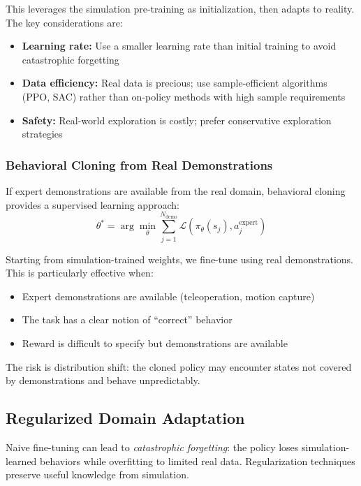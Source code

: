 This leverages the simulation pre-training as initialization, then adapts to reality. The key considerations are:
\begin{itemize}
    \item \textbf{Learning rate:} Use a smaller learning rate than initial training to avoid catastrophic forgetting
    \item \textbf{Data efficiency:} Real data is precious; use sample-efficient algorithms (PPO, SAC) rather than on-policy methods with high sample requirements
    \item \textbf{Safety:} Real-world exploration is costly; prefer conservative exploration strategies
\end{itemize}

\subsubsection{Behavioral Cloning from Real Demonstrations}

If expert demonstrations are available from the real domain, behavioral cloning provides a supervised learning approach:
\begin{equation}
\theta^* = \arg\min_\theta \sum_{j=1}^{N_{\text{demo}}} \mathcal{L}(\pi_\theta(s_j), a_j^{\text{expert}})
\end{equation}

Starting from simulation-trained weights, we fine-tune using real demonstrations. This is particularly effective when:
\begin{itemize}
    \item Expert demonstrations are available (teleoperation, motion capture)
    \item The task has a clear notion of ``correct'' behavior
    \item Reward is difficult to specify but demonstrations are available
\end{itemize}

The risk is distribution shift: the cloned policy may encounter states not covered by demonstrations and behave unpredictably.

\subsection{Regularized Domain Adaptation}

Naive fine-tuning can lead to \textit{catastrophic forgetting}: the policy loses simulation-learned behaviors while overfitting to limited real data. Regularization techniques preserve useful knowledge from simulation.

